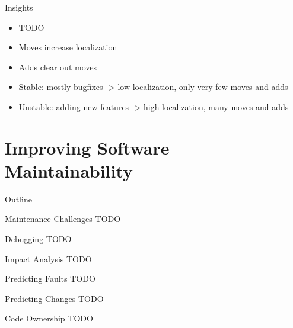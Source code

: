 
\begin{frame}{Insights}
  \begin{itemize}
  \item TODO
  \item Moves increase localization
  \item Adds clear out moves
  \item Stable: mostly bugfixes -> low localization, only very few
    moves and adds
  \item Unstable: adding new features -> high localization, many moves
    and adds
  \end{itemize}
\end{frame}



\section{Improving Software Maintainability}

\begin{frame}{Outline}
  \tableofcontents[current]
\end{frame}


\begin{frame}{Maintenance Challenges}
  TODO
\end{frame}


\begin{frame}{Debugging}
  TODO
\end{frame}


\begin{frame}{Impact Analysis}
  TODO
\end{frame}


\begin{frame}{Predicting Faults}
  TODO
\end{frame}


\begin{frame}{Predicting Changes}
  TODO
\end{frame}


\begin{frame}{Code Ownership}
  TODO
\end{frame}

